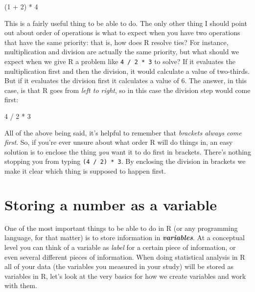 \documentclass[
]{book}
\newenvironment{Shaded}{\begin{snugshade}}{\end{snugshade}}
\newcommand{\DecValTok}[1]{\textcolor[rgb]{0.00,0.00,0.81}{#1}}
\newcommand{\NormalTok}[1]{#1}
\newcommand{\SpecialCharTok}[1]{\textcolor[rgb]{0.00,0.00,0.00}{#1}}
\begin{document}
\begin{Shaded}
\begin{Highlighting}[]
\NormalTok{(}\DecValTok{1} \SpecialCharTok{+} \DecValTok{2}\NormalTok{) }\SpecialCharTok{*} \DecValTok{4} 
\end{Highlighting}
\end{Shaded}

This is a fairly useful thing to be able to do. The only other thing I should point out about order of operations is what to expect when you have two operations that have the same priority: that is, how does R resolve ties? For instance, multiplication and division are actually the same priority, but what should we expect when we give R a problem like \texttt{4\ /\ 2\ *\ 3} to solve? If it evaluates the multiplication first and then the division, it would calculate a value of two-thirds. But if it evaluates the division first it calculates a value of 6. The answer, in this case, is that R goes from \emph{left to right}, so in this case the division step would come first:

\begin{Shaded}
\begin{Highlighting}[]
\DecValTok{4} \SpecialCharTok{/} \DecValTok{2} \SpecialCharTok{*} \DecValTok{3}
\end{Highlighting}
\end{Shaded}

All of the above being said, it's helpful to remember that \emph{brackets always come first}. So, if you're ever unsure about what order R will do things in, an easy solution is to enclose the thing \emph{you} want it to do first in brackets. There's nothing stopping you from typing \texttt{(4\ /\ 2)\ *\ 3}. By enclosing the division in brackets we make it clear which thing is supposed to happen first.

\hypertarget{assign}{%
\section{Storing a number as a variable}\label{assign}}

One of the most important things to be able to do in R (or any programming language, for that matter) is to store information in \textbf{\emph{variables}}. At a conceptual level you can think of a variable as \emph{label} for a certain piece of information, or even several different pieces of information. When doing statistical analysis in R all of your data (the variables you measured in your study) will be stored as variables in R, let's look at the very basics for how we create variables and work with them.
\end{document}
